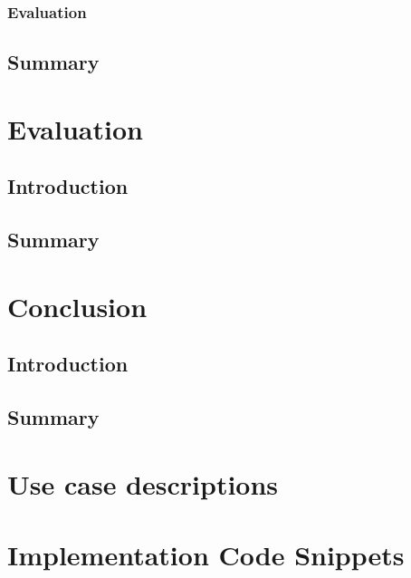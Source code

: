 \documentclass[11pt,oneside]{report}
\newcommand\code[1]{\texttt{#1}}
\begin{document}
		\subsection{Evaluation}
	\section{Summary}

	
	\chapter{Evaluation}\label{chap:eval}
	\section{Introduction}
	\section{Summary}
	
	\chapter{Conclusion}\label{chap:concl}
	\section{Introduction}
	\section{Summary}
	\clearpage
	
	
	\begin{appendices}
	\chapter{Use case descriptions} \label{app:use_case_descriptions}
			
			
			
			
			
			
			
			
	\chapter{Implementation Code Snippets}
			
	\end{appendices}
	
\end{document}
